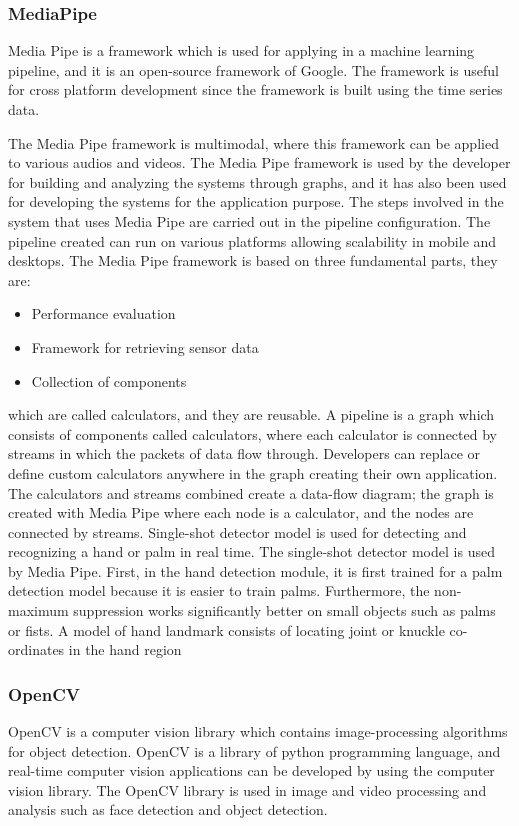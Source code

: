 \documentclass[12pt,a4paper]{report}
\begin{document}
		\subsubsection{MediaPipe}
			{Media Pipe is a framework which is used for applying in a machine learning pipeline, and it is an open-source framework of Google.\cite{r3} The framework is useful for cross platform development since the framework is built using the time series data. 

The Media Pipe framework is multimodal, where this framework can be applied to various audios and videos. The Media Pipe framework is used by the developer for building and analyzing the systems through graphs, and it has also been used for developing the systems for the application purpose.\cite{r1} The steps involved in the system that uses Media Pipe are carried out in the pipeline configuration. The pipeline created can run on various platforms allowing scalability in mobile and desktops. The Media Pipe framework is based on three fundamental parts, they are:

\begin{itemize}
    \item Performance evaluation 
    \item Framework for retrieving sensor data 
    \item Collection of components
\end{itemize}

which are called calculators, and they are reusable. A pipeline is a graph which consists of components called calculators, where each calculator is connected by streams in which the packets of data flow through. Developers can replace or define custom calculators anywhere in the graph creating their own application. The calculators and streams combined create a data-flow diagram; the graph is created with Media Pipe where each node is a calculator, and the nodes are connected by streams. Single-shot detector model is used for detecting and recognizing a hand or palm in real time. The single-shot detector model is used by Media Pipe.\cite{r4} First, in the hand detection module, it is first trained for a palm detection model because it is easier to train palms. Furthermore, the non-maximum suppression works significantly better on small objects such as palms or fists. A model of hand landmark consists of locating joint or knuckle co-ordinates in the hand region }
	\label{OpenCV}
	\subsubsection{OpenCV}
	{
	OpenCV is a computer vision library which contains image-processing algorithms for object detection. OpenCV is a library of python programming language, and real-time computer vision applications can be developed by using the computer vision library.\cite{r6} The OpenCV library is used in image and video processing and analysis such as face detection and object detection. \cite{r7} 
}	
	\label{PyAutoGUI}
\end{document}
